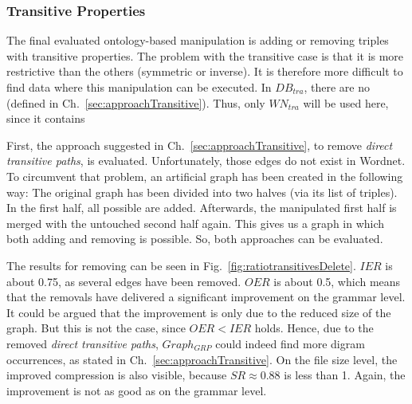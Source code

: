 \clearpage
\subsubsection{Transitive Properties}

The final evaluated ontology-based manipulation is adding or removing triples with transitive properties. The problem with the transitive case is that it is more restrictive than the others (symmetric or inverse). It is therefore more difficult to find data where this manipulation can be executed. In $DB_{tra}$, there are no \tps (defined in Ch.~\ref{sec:approachTransitive}). Thus, only $WN_{tra}$ will be used here, since it contains \tpsp

First, the approach suggested in Ch.~\ref{sec:approachTransitive}, to remove \textit{direct transitive paths}, is evaluated. Unfortunately, those edges do not exist in Wordnet. To circumvent that problem, an artificial graph has been created in the following way:  The original graph has been divided into two halves (via its list of triples). In the first half, all possible \dtps are added. Afterwards, the manipulated first half is merged with the untouched second half again. This gives us a graph in which both adding and removing \dtps is possible. So, both approaches can be evaluated.

The results for removing \dtps can be seen in Fig.~\ref{fig:ratiotransitivesDelete}. $IER$ is about 0.75, as several edges have been removed. $OER$ is about 0.5, which means that the removals have delivered a significant improvement on the grammar level. It could be argued that the improvement is only due to the reduced size of the graph. But this is not the case, since $OER<IER$ holds. Hence, due to the removed \textit{direct transitive paths}, $Graph_{GRP}$ could indeed find more digram occurrences, as stated in Ch.~\ref{sec:approachTransitive}. On the file size level, the improved compression is also visible, because $SR\approx0.88$ is less than 1. Again, the improvement is not as good as on the grammar level.

